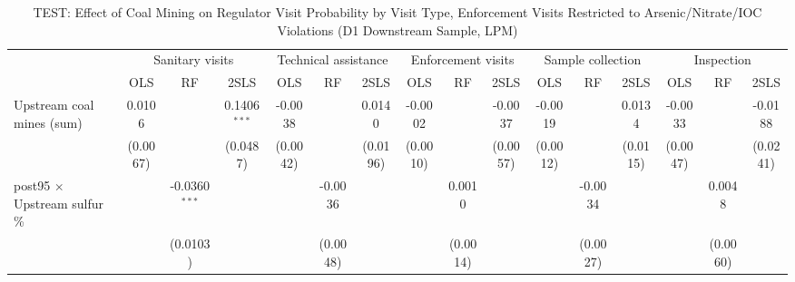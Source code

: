 
\begin{table}[htbp]
   
   \caption{\label{tab:test_h2_snsv_chem} TEST: Effect of Coal Mining on Regulator Visit Probability by Visit Type, Enforcement Visits Restricted to Arsenic/Nitrate/IOC Violations (D1 Downstream Sample, LPM)}
   \bigskip
   
   \centering
   
   \begin{adjustbox}{width = \textwidth, center}
      
      
      \begin{tabular}{lccccccccccccccc}
         \toprule
         
          & \multicolumn{3}{c}{Sanitary visits} & \multicolumn{3}{c}{Technical assistance} & \multicolumn{3}{c}{Enforcement visits} & \multicolumn{3}{c}{Sample collection} & \multicolumn{3}{c}{Inspection}\\
         
                                                                  & OLS           & RF              & 2SLS           & OLS           & RF            & 2SLS          & OLS           & RF            & 2SLS          & OLS           & RF            & 2SLS          & OLS           & RF            & 2SLS\\  
         
         \midrule 
         Upstream coal mines (sum)                                & 0.0106        &                 & 0.1406$^{***}$ & -0.0038       &               & 0.0140        & -0.0002       &               & -0.0037       & -0.0019       &               & 0.0134        & -0.0033       &               & -0.0188\\   
                                                                  & (0.0067)      &                 & (0.0487)       & (0.0042)      &               & (0.0196)      & (0.0010)      &               & (0.0057)      & (0.0012)      &               & (0.0115)      & (0.0047)      &               & (0.0241)\\   
         post95 $\times$ Upstream sulfur \%                       &               & -0.0360$^{***}$ &                &               & -0.0036       &               &               & 0.0010        &               &               & -0.0034       &               &               & 0.0048        &   \\   
                                                                  &               & (0.0103)        &                &               & (0.0048)      &               &               & (0.0014)      &               &               & (0.0027)      &               &               & (0.0060)      &   \\   
         

\end{tabular}
\end{adjustbox}
\end{table}
